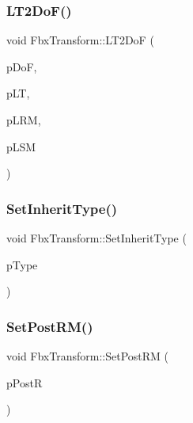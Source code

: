 \subsubsection{\texorpdfstring{L\+T2\+Do\+F()}{LT2DoF()}}
{\footnotesize\ttfamily void Fbx\+Transform\+::\+L\+T2\+DoF (\begin{DoxyParamCaption}\item[{\hyperlink{class_fbx_vector4}{Fbx\+Vector4} \&}]{p\+DoF,  }\item[{const \hyperlink{class_fbx_vector4}{Fbx\+Vector4} \&}]{p\+LT,  }\item[{const \hyperlink{class_fbx_a_matrix}{Fbx\+A\+Matrix} \&}]{p\+L\+RM,  }\item[{const \hyperlink{class_fbx_a_matrix}{Fbx\+A\+Matrix} \&}]{p\+L\+SM }\end{DoxyParamCaption})}

\mbox{\label{class_fbx_transform_a45fed2a2ce79d3be60f8db31303f8e03}} 
\subsubsection{\texorpdfstring{Set\+Inherit\+Type()}{SetInheritType()}}
{\footnotesize\ttfamily void Fbx\+Transform\+::\+Set\+Inherit\+Type (\begin{DoxyParamCaption}\item[{\hyperlink{class_fbx_transform_ac1ab8f75b4873723daa68c57f999b10f}{E\+Inherit\+Type}}]{p\+Type }\end{DoxyParamCaption})}

\mbox{\label{class_fbx_transform_aa2083d4610e0f3dac32ac07f1b0b67f3}} 
\subsubsection{\texorpdfstring{Set\+Post\+R\+M()}{SetPostRM()}}
{\footnotesize\ttfamily void Fbx\+Transform\+::\+Set\+Post\+RM (\begin{DoxyParamCaption}\item[{const \hyperlink{class_fbx_vector4}{Fbx\+Vector4} \&}]{p\+PostR }\end{DoxyParamCaption})}

